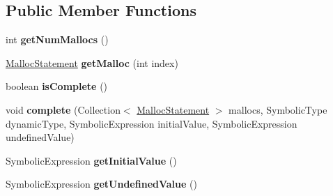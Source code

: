 \subsection*{Public Member Functions}
\begin{DoxyCompactItemize}
\item 
\hypertarget{interfaceedu_1_1udel_1_1cis_1_1vsl_1_1civl_1_1model_1_1IF_1_1type_1_1CIVLHeapType_af51b2fae8597e6a3040efa3e1ffd0cbf}{}int {\bfseries get\+Num\+Mallocs} ()\label{interfaceedu_1_1udel_1_1cis_1_1vsl_1_1civl_1_1model_1_1IF_1_1type_1_1CIVLHeapType_af51b2fae8597e6a3040efa3e1ffd0cbf}

\item 
\hypertarget{interfaceedu_1_1udel_1_1cis_1_1vsl_1_1civl_1_1model_1_1IF_1_1type_1_1CIVLHeapType_ac339d66fe297dac69bb2a371e34d7301}{}\hyperlink{interfaceedu_1_1udel_1_1cis_1_1vsl_1_1civl_1_1model_1_1IF_1_1statement_1_1MallocStatement}{Malloc\+Statement} {\bfseries get\+Malloc} (int index)\label{interfaceedu_1_1udel_1_1cis_1_1vsl_1_1civl_1_1model_1_1IF_1_1type_1_1CIVLHeapType_ac339d66fe297dac69bb2a371e34d7301}

\item 
\hypertarget{interfaceedu_1_1udel_1_1cis_1_1vsl_1_1civl_1_1model_1_1IF_1_1type_1_1CIVLHeapType_aa5c554045fb65d47ea7df94b76f5a32a}{}boolean {\bfseries is\+Complete} ()\label{interfaceedu_1_1udel_1_1cis_1_1vsl_1_1civl_1_1model_1_1IF_1_1type_1_1CIVLHeapType_aa5c554045fb65d47ea7df94b76f5a32a}

\item 
\hypertarget{interfaceedu_1_1udel_1_1cis_1_1vsl_1_1civl_1_1model_1_1IF_1_1type_1_1CIVLHeapType_a00c4f41d9667f49cf4efad0ef86612aa}{}void {\bfseries complete} (Collection$<$ \hyperlink{interfaceedu_1_1udel_1_1cis_1_1vsl_1_1civl_1_1model_1_1IF_1_1statement_1_1MallocStatement}{Malloc\+Statement} $>$ mallocs, Symbolic\+Type dynamic\+Type, Symbolic\+Expression initial\+Value, Symbolic\+Expression undefined\+Value)\label{interfaceedu_1_1udel_1_1cis_1_1vsl_1_1civl_1_1model_1_1IF_1_1type_1_1CIVLHeapType_a00c4f41d9667f49cf4efad0ef86612aa}

\item 
\hypertarget{interfaceedu_1_1udel_1_1cis_1_1vsl_1_1civl_1_1model_1_1IF_1_1type_1_1CIVLHeapType_a4a2bbffd89ce20ccb1296ae7d672d2a3}{}Symbolic\+Expression {\bfseries get\+Initial\+Value} ()\label{interfaceedu_1_1udel_1_1cis_1_1vsl_1_1civl_1_1model_1_1IF_1_1type_1_1CIVLHeapType_a4a2bbffd89ce20ccb1296ae7d672d2a3}

\item 
\hypertarget{interfaceedu_1_1udel_1_1cis_1_1vsl_1_1civl_1_1model_1_1IF_1_1type_1_1CIVLHeapType_ab537ab44b69436f602f4575ddda75bcc}{}Symbolic\+Expression {\bfseries get\+Undefined\+Value} ()\label{interfaceedu_1_1udel_1_1cis_1_1vsl_1_1civl_1_1model_1_1IF_1_1type_1_1CIVLHeapType_ab537ab44b69436f602f4575ddda75bcc}


\end{DoxyCompactItemize}
